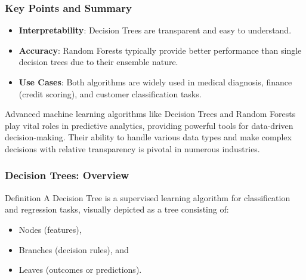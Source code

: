 \documentclass[aspectratio=169]{beamer}
\begin{document}
\begin{frame}[fragile]
    \frametitle{Key Points and Summary}
    \begin{itemize}
        \item \textbf{Interpretability}: Decision Trees are transparent and easy to understand.
        \item \textbf{Accuracy}: Random Forests typically provide better performance than single decision trees due to their ensemble nature.
        \item \textbf{Use Cases}: Both algorithms are widely used in medical diagnosis, finance (credit scoring), and customer classification tasks.
    \end{itemize}

    Advanced machine learning algorithms like Decision Trees and Random Forests play vital roles in predictive analytics, providing powerful tools for data-driven decision-making. 
    Their ability to handle various data types and make complex decisions with relative transparency is pivotal in numerous industries.
\end{frame}

\begin{frame}[fragile]
    \frametitle{Decision Trees: Overview}
    \begin{block}{Definition}
        A Decision Tree is a supervised learning algorithm for classification and regression tasks, visually depicted as a tree consisting of:
        \begin{itemize}
            \item Nodes (features),
            \item Branches (decision rules), and
            \item Leaves (outcomes or predictions).
        \end{itemize}
    \end{block}
\end{frame}
\end{document}
